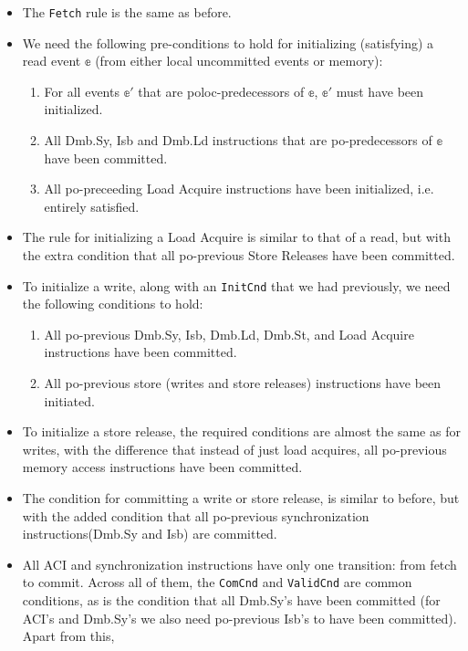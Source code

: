 \documentclass{article}
\begin{document}
\begin{itemize}
    \setlength\itemsep{0em}
    \item The \texttt{Fetch} rule is the same as before.
    \item We need the following pre-conditions to hold for initializing (satisfying) a read event $\mathbb{e}$ (from either local uncommitted events or memory):
        \begin{enumerate}
            \setlength\itemsep{0em}
            \item For all events $\mathbb{e}'$ that are poloc-predecessors of $\mathbb{e}$, $\mathbb{e}'$ must have been initialized.
            \item All Dmb.Sy, Isb and Dmb.Ld instructions that are po-predecessors of $\mathbb{e}$ have been committed.
            \item All po-preceeding Load Acquire instructions have been initialized, i.e. entirely satisfied.
        \end{enumerate}
    \item The rule for initializing a Load Acquire is similar to that of a read, but with the extra condition that all po-previous Store Releases have been committed.
    \item To initialize a write, along with an \texttt{InitCnd} that we had previously, we need the following conditions to hold:
    \begin{enumerate}
        \setlength\itemsep{0em}
        \item All po-previous Dmb.Sy, Isb, Dmb.Ld, Dmb.St, and Load Acquire instructions have been committed.
        \item All po-previous store (writes and store releases) instructions have been initiated.
    \end{enumerate}
    \item To initialize a store release, the required conditions are almost the same as for writes, with the difference that instead of just load acquires, all po-previous memory access instructions have been committed.
    \item The condition for committing a write or store release, is similar to before, but with the added condition that all po-previous synchronization instructions(Dmb.Sy and Isb) are committed.
    \item All ACI and synchronization instructions have only one transition: from fetch to commit. Across all of them, the \texttt{ComCnd} and \texttt{ValidCnd} are common conditions, as is the condition that all Dmb.Sy's have been committed (for ACI's and Dmb.Sy's we also need po-previous Isb's to have been committed). Apart from this,

\end{itemize}
\end{document}
